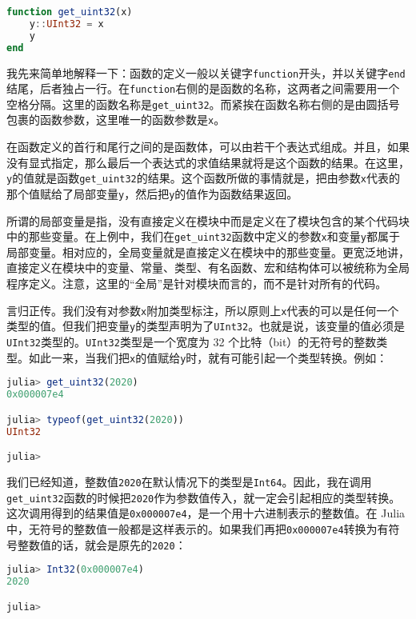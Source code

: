 \begin{lstlisting}[language=julia]
function get_uint32(x)
    y::UInt32 = x
    y
end
\end{lstlisting}

我先来简单地解释一下：函数的定义一般以关键字\verb`function`开头，并以关键字\verb`end`结尾，后者独占一行。在\verb`function`右侧的是函数的名称，这两者之间需要用一个空格分隔。这里的函数名称是\verb`get_uint32`。而紧挨在函数名称右侧的是由圆括号包裹的函数参数，这里唯一的函数参数是\verb`x`。

在函数定义的首行和尾行之间的是函数体，可以由若干个表达式组成。并且，如果没有显式指定，那么最后一个表达式的求值结果就将是这个函数的结果。在这里，\verb`y`的值就是函数\verb`get_uint32`的结果。这个函数所做的事情就是，把由参数\verb`x`代表的那个值赋给了局部变量\verb`y`，然后把\verb`y`的值作为函数结果返回。

所谓的局部变量是指，没有直接定义在模块中而是定义在了模块包含的某个代码块中的那些变量。在上例中，我们在\verb`get_uint32`函数中定义的参数\verb`x`和变量\verb`y`都属于局部变量。相对应的，全局变量就是直接定义在模块中的那些变量。更宽泛地讲，直接定义在模块中的变量、常量、类型、有名函数、宏和结构体可以被统称为全局程序定义。注意，这里的“全局”是针对模块而言的，而不是针对所有的代码。

言归正传。我们没有对参数\verb`x`附加类型标注，所以原则上\verb`x`代表的可以是任何一个类型的值。但我们把变量\verb`y`的类型声明为了\verb`UInt32`。也就是说，该变量的值必须是\verb`UInt32`类型的。\verb`UInt32`类型是一个宽度为 32 个比特（bit）的无符号的整数类型。如此一来，当我们把\verb`x`的值赋给\verb`y`时，就有可能引起一个类型转换。例如：

\begin{lstlisting}[language=julia]
julia> get_uint32(2020)
0x000007e4

julia> typeof(get_uint32(2020))
UInt32

julia> 
\end{lstlisting}

我们已经知道，整数值\verb`2020`在默认情况下的类型是\verb`Int64`。因此，我在调用\verb`get_uint32`函数的时候把\verb`2020`作为参数值传入，就一定会引起相应的类型转换。这次调用得到的结果值是\verb`0x000007e4`，是一个用十六进制表示的整数值。在 Julia 中，无符号的整数值一般都是这样表示的。如果我们再把\verb`0x000007e4`转换为有符号整数值的话，就会是原先的\verb`2020`：

\begin{lstlisting}[language=julia]
julia> Int32(0x000007e4)
2020

julia> 
\end{lstlisting}


